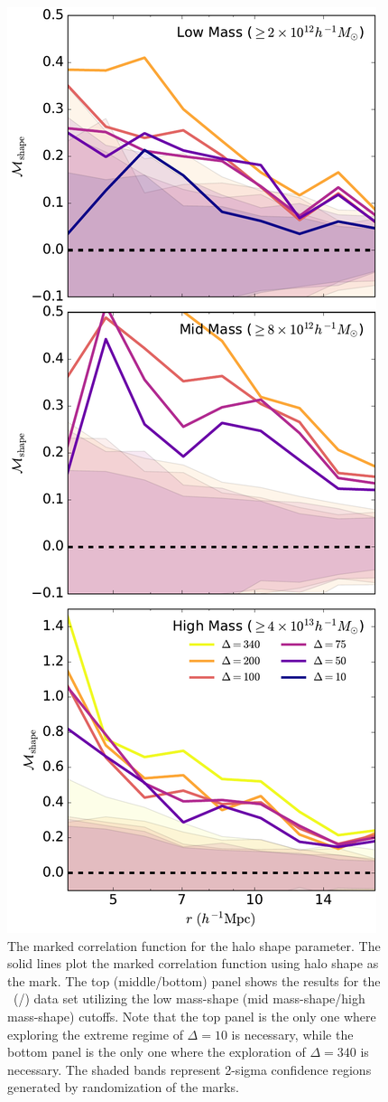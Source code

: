 \documentclass[usenatbib]{mnras}
\begin{document}
\begin{figure}
	\centering
	\includegraphics[width=.4\textwidth]{all_mcf_shape.pdf}
	\caption{
The marked correlation function for the halo shape parameter. The solid lines plot the marked correlation function using halo shape as the mark. The top (middle/bottom) panel shows the results for the
\simA \ (\simB /\simC) data set utilizing the low mass-shape (mid mass-shape/high mass-shape) cutoffs. Note
that the top panel is the only one where exploring the extreme regime of $\Delta = 10$ is
necessary, while the bottom panel is the only one where the exploration of $\Delta = 340$
is necessary. The shaded bands represent 2-sigma confidence regions generated by randomization of the marks.}
	\label{fig:cc_mcf_s}
\end{figure}
\end{document}
